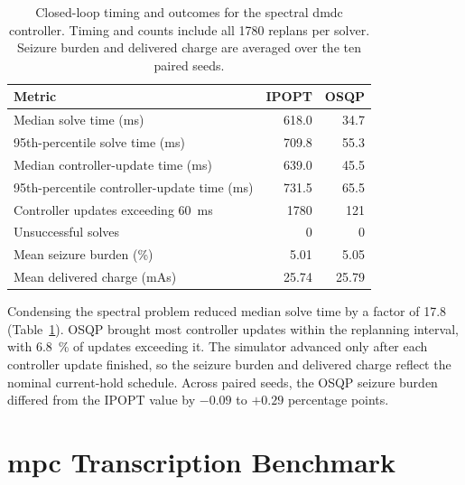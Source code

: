 \begin{table}
  \centering
  \caption{Closed-loop timing and outcomes for the spectral \ac{dmdc} controller. Timing and counts include all \num{1780} replans per solver. Seizure burden and delivered charge are averaged over the ten paired seeds.}\label{tab:dmdc_closed_loop_timing}
  \begin{tabular}{lrr}
    \toprule
    Metric & IPOPT & OSQP \\
    \midrule
    Median solve time (ms)                  & 618.0 & 34.7 \\
    95th-percentile solve time (ms)          & 709.8 & 55.3 \\
    Median controller-update time (ms)      & 639.0 & 45.5 \\
    95th-percentile controller-update time (ms) & 731.5 & 65.5 \\
    Controller updates exceeding \SI{60}{\milli\second} & 1780 & 121 \\
    Unsuccessful solves                    & 0 & 0 \\
    Mean seizure burden (\%)                & 5.01 & 5.05 \\
    Mean delivered charge (mAs)             & 25.74 & 25.79 \\
    \bottomrule
  \end{tabular}
\end{table}

Condensing the spectral problem reduced median solve time by a factor of 17.8 (Table~\ref{tab:dmdc_closed_loop_timing}).
OSQP brought most controller updates within the replanning interval, with \SI{6.8}{\percent} of updates exceeding it.
The simulator advanced only after each controller update finished, so the seizure burden and delivered charge reflect the nominal current-hold schedule.
Across paired seeds, the OSQP seizure burden differed from the IPOPT value by $-0.09$ to $+0.29$ percentage points.

\chapter{\acs{mpc} Transcription Benchmark}\label{app:transcription_benchmark}

